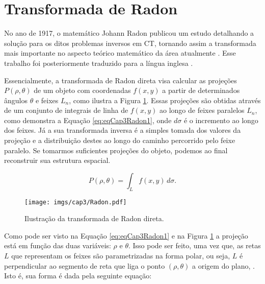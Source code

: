  
\section{Transformada de Radon}\label{TransformadaRadon2D}

No ano de 1917, o matemático Johann Radon publicou um estudo detalhando a solução para os ditos problemas inversos em \acs{CT}, tornando assim a transformada mais importante no aspecto teórico matemático da área atualmente \cite{radon1917uber}. Esse trabalho foi posteriormente traduzido para a língua inglesa \cite{radon1986determination}.

Essencialmente, a transformada de Radon direta visa calcular as projeções $P(\rho,\theta)$ de um objeto com coordenadas $f(x,y)$ a partir de determinados ângulos $\theta$ e feixes $L_{n}$, como ilustra a Figura \ref{fig:imgCap3Radon}. Essas projeções são obtidas através de um conjunto de integrais de linha de $f(x,y)$ ao longo de feixes paralelos  $L_{n}$, como demonstra a Equação \ref{eq:eqCap3Radon1}, onde $d\sigma$ é o incremento ao longo dos feixes. Já a sua transformada inversa é a simples tomada dos valores da projeção e a distribuição destes ao longo do caminho percorrido pelo feixe paralelo. Se tomarmos suficientes projeções do objeto, podemos ao final reconstruir sua estrutura espacial. 

\begin{equation} 
P(\rho,\theta) = {\int_{L}^{} f(x,y) \, d\sigma}.
\label{eq:eqCap3Radon1}
\end{equation}


\begin{figure}[H]
	\caption{Ilustração da transformada de Radon direta.}
	\begin{center}
		\texttt{[image: imgs/cap3/Radon.pdf]}
	\end{center}
	\label{fig:imgCap3Radon}
\end{figure}

Como pode ser visto na Equação \ref{eq:eqCap3Radon1} e na Figura \ref{fig:imgCap3Radon} a projeção está em função das duas variáveis: $\rho$ e $\theta$. Isso pode ser feito, uma vez que, as retas $L$ que representam os feixes são parametrizadas na forma polar, ou seja, $L$ é perpendicular ao segmento de reta que liga  o ponto $(\rho, \theta)$ a origem do plano,  \cite{yang2012numerical}. Isto é, sua forma é dada pela seguinte equação:

